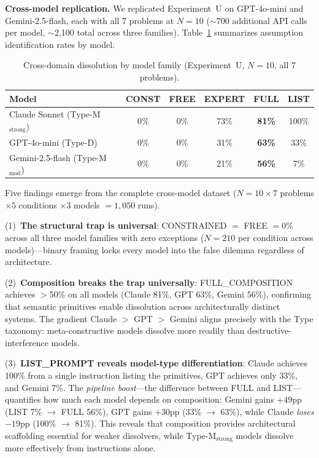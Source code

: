 \documentclass[11pt,a4paper]{article}
\begin{document}
\textbf{Cross-model replication.} We replicated Experiment~U on GPT-4o-mini and Gemini-2.5-flash, each with all 7 problems at $N=10$ ($\sim$700 additional API calls per model, $\sim$2,100 total across three families). Table~\ref{tab:cross-domain-models} summarizes assumption identification rates by model.

\begin{table}[H]
\centering
\caption{Cross-domain dissolution by model family (Experiment~U, $N=10$, all 7 problems).}
\small
\begin{tabular}{lccccc}
\toprule
\textbf{Model} & \textbf{CONST} & \textbf{FREE} & \textbf{EXPERT} & \textbf{FULL} & \textbf{LIST} \\
\midrule
Claude Sonnet (Type-M$_{\text{strong}}$)    & 0\%  & 0\%  & 73\%  & \textbf{81\%}  & 100\% \\
GPT-4o-mini (Type-D)                        & 0\%  & 0\%  & 31\%  & \textbf{63\%}  & 33\%  \\
Gemini-2.5-flash (Type-M$_{\text{mod}}$)    & 0\%  & 0\%  & 21\%  & \textbf{56\%}  & 7\%   \\
\bottomrule
\end{tabular}
\label{tab:cross-domain-models}
\end{table}

Five findings emerge from the complete cross-model dataset ($N=10 \times 7$ problems $\times 5$ conditions $\times 3$ models $= 1{,}050$ runs).

(1)~\textbf{The structural trap is universal}: CONSTRAINED $=$ FREE $= 0\%$ across all three model families with zero exceptions ($N=210$ per condition across models)---binary framing locks every model into the false dilemma regardless of architecture.

(2)~\textbf{Composition breaks the trap universally}: FULL\_COMPOSITION achieves $>$50\% on all models (Claude 81\%, GPT 63\%, Gemini 56\%), confirming that semantic primitives enable dissolution across architecturally distinct systems. The gradient Claude $>$ GPT $>$ Gemini aligns precisely with the Type taxonomy: meta-constructive models dissolve more readily than destructive-interference models.

(3)~\textbf{LIST\_PROMPT reveals model-type differentiation}: Claude achieves 100\% from a single instruction listing the primitives, GPT achieves only 33\%, and Gemini 7\%. The \emph{pipeline boost}---the difference between FULL and LIST---quantifies how much each model depends on composition: Gemini gains $+49$pp (LIST 7\% $\to$ FULL 56\%), GPT gains $+30$pp (33\% $\to$ 63\%), while Claude \emph{loses} $-19$pp (100\% $\to$ 81\%). This reveals that composition provides architectural scaffolding essential for weaker dissolvers, while Type-M$_{\text{strong}}$ models dissolve more effectively from instructions alone.
\end{document}
